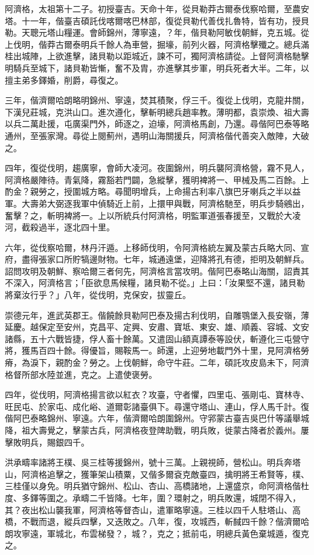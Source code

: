\begin{pinyinscope}
阿濟格，太祖第十二子。初授臺吉。天命十年，從貝勒莽古爾泰伐察哈爾，至農安塔。十一年，偕臺吉碩託伐喀爾喀巴林部，復從貝勒代善伐扎魯特，皆有功，授貝勒。天聰元塔山糧運。會師錦州，薄寧遠，？年，偕貝勒阿敏伐朝鮮，克五城。從上伐明，偕莽古爾泰明兵千餘人為車營，掘壕，前列火器，阿濟格擊殲之。總兵滿桂出城陣，上欲進擊，諸貝勒以距城近，諫不可，獨阿濟格請從。上督阿濟格馳擊明騎兵至城下，諸貝勒皆慚，奮不及胄，亦進擊其步軍，明兵死者大半。二年，以擅主弟多鐸婚，削爵，尋復之。

三年，偕濟爾哈朗略明錦州、寧遠，焚其積聚，俘三千。復從上伐明，克龍井關，下漢兒莊城，克洪山口。進次遵化，擊斬明總兵趙率教。薄明都，袁崇煥、祖大壽以兵二萬赴援，屯廣渠門外，師逐之，迫壕，阿濟格馬創，乃還。尋偕阿巴泰等略通州，至張家灣。尋從上閱薊州，遇明山海關援兵，阿濟格偕代善突入敵陣，大破之。

四年，復從伐明，趨廣寧，會師大凌河。夜圍錦州，明兵襲阿濟格營，霧不見人，阿濟格嚴陣待。青氣降，霧豁若門闢，急縱擊，獲明裨將一、甲械及馬二百餘。上酌金？親勞之，授圍城方略。尋聞明增兵，上命揚古利率八旗巴牙喇兵之半以益軍。大壽弟大弼逐我軍中偵騎近上前，上擐甲與戰，阿濟格馳至，明兵步騎鵷出，奮擊？之，斬明裨將一。上以所統兵付阿濟格，明監軍道張春援至，又戰於大凌河，截殺過半，逐北四十里。

六年，從伐察哈爾，林丹汗遁。上移師伐明，令阿濟格統左翼及蒙古兵略大同、宣府，盡得張家口所貯犒邊財物。七年，城通遠堡，迎降將孔有德，拒明及朝鮮兵。詔問攻明及朝鮮、察哈爾三者何先，阿濟格言當攻明。偕阿巴泰略山海關，詔責其不深入，阿濟格言；「臣欲息馬候糧，諸貝勒不從。」上曰：「汝果堅不還，諸貝勒將棄汝行乎？」八年，從伐明，克保安，拔靈丘。

崇德元年，進武英郡王。偕饒餘貝勒阿巴泰及揚古利伐明，自雕鶚堡入長安嶺，薄延慶。越保定至安州，克昌平、定興、安肅、寶坻、東安、雄、順義、容城、文安諸縣，五十六戰皆捷，俘人畜十餘萬。又遣固山額真譚泰等設伏，斬遵化三屯營守將，獲馬百四十餘。得優旨，賜鞍馬一。師還，上迎勞地載門外十里，見阿濟格勞瘠，為淚下，親酌金？勞之。上伐朝鮮，命守牛莊。二年，碩託攻皮島未下，阿濟格督所部水陸並進，克之。上遣使褒勞。

四年，從伐明，阿濟格揚言欲以紅衣？攻臺，守者懼，四里屯、張剛屯、寶林寺、旺民屯、於家屯、成化峪、道爾彰諸臺俱下。尋還守塔山、連山，俘人馬千計。復偕阿巴泰略錦州、寧遠。六年，偕濟爾哈朗圍錦州。守郛蒙古臺吉吳巴什等議舉城降，祖大壽覺之，擊蒙古兵，阿濟格夜登陴助戰，明兵敗，徙蒙古降者於義州。屢擊敗明兵，賜銀四千。

洪承疇率諸將王樸、吳三桂等援錦州，號十三萬。上親視師，營松山。明兵奔塔山，阿濟格追擊之，獲筆架山積粟，又偕多爾袞克敵臺四，擒明將王希賢等，樸、三桂僅以身免。明兵猶守錦州、松山、杏山、高橋諸地，上還盛京，命阿濟格偕杜度、多鐸等圍之。承疇二千皆降。七年，圍？環射之，明兵敗還，城閉不得入，其？夜出松山襲我軍，阿濟格等督杏山，遣軍略寧遠。三桂以四千人駐塔山、高橋，不戰而退，縱兵四擊，又迭敗之。八年，復，攻城西，斬馘四千餘？偕濟爾哈朗攻寧遠，軍城北，布雲梯發？，城？，克之；抵前屯，明總兵黃色棄城遁，復克之。


\end{pinyinscope}

